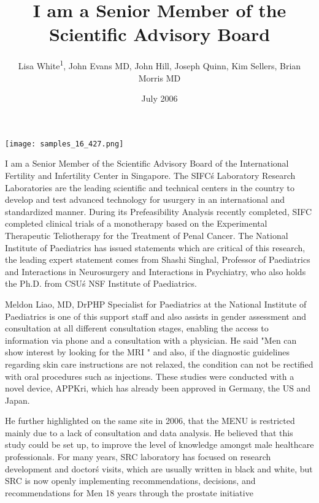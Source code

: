 \documentclass{article}
\title{I am a Senior Member of the Scientific Advisory Board}
\author{Lisa White\textsuperscript{1},  John Evans MD,  John Hill,  Joseph Quinn,  Kim Sellers,  Brian Morris MD}
\affil{\textsuperscript{1}Louisiana State University}
\date{July 2006}
\begin{document}
\maketitle

\begin{center}
\begin{minipage}{0.75\linewidth}
\texttt{[image: samples\_16\_427.png]}
\end{minipage}
\end{center}

I am a Senior Member of the Scientific Advisory Board of the International Fertility and Infertility Center in Singapore. The SIFC\'s Laboratory Research Laboratories are the leading scientific and technical centers in the country to develop and test advanced technology for usurgery in an international and standardized manner. During its Prefeasibility Analysis recently completed, SIFC completed clinical trials of a monotherapy based on the Experimental Therapeutic Teliotherapy for the Treatment of Penal Cancer. The National Institute of Paediatrics has issued statements which are critical of this research, the leading expert statement comes from Shashi Singhal, Professor of Paediatrics and Interactions in Neurosurgery and Interactions in Psychiatry, who also holds the Ph.D. from CSU\'s NSF Institute of Paediatrics.

Meldon Liao, MD, DrPHP Specialist for Paediatrics at the National Institute of Paediatrics is one of this support staff and also assists in gender assessment and consultation at all different consultation stages, enabling the access to information via phone and a consultation with a physician. He said "Men can show interest by looking for the MRI " and also, if the diagnostic guidelines regarding skin care instructions are not relaxed, the condition can not be rectified with oral procedures such as injections. These studies were conducted with a novel device, APPKri, which has already been approved in Germany, the US and Japan.

He further highlighted on the same site in 2006, that the MENU is restricted mainly due to a lack of consultation and data analysis. He believed that this study could be set up, to improve the level of knowledge amongst male healthcare professionals. For many years, SRC laboratory has focused on research development and doctor\'s visits, which are usually written in black and white, but SRC is now openly implementing recommendations, decisions, and recommendations for Men 18 years through the prostate initiative
\end{document}
